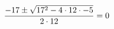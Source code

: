 \documentclass[preview]{standalone}
\begin{document}
\begin{align*}
\special{dvisvgm:raw <g id='unique000'>}\frac{-17 \pm \sqrt{17^2 - 4 \cdot 12 \cdot -5}}{2 \cdot 12} &= 0\special{dvisvgm:raw </g>}
\end{align*}
\end{document}
